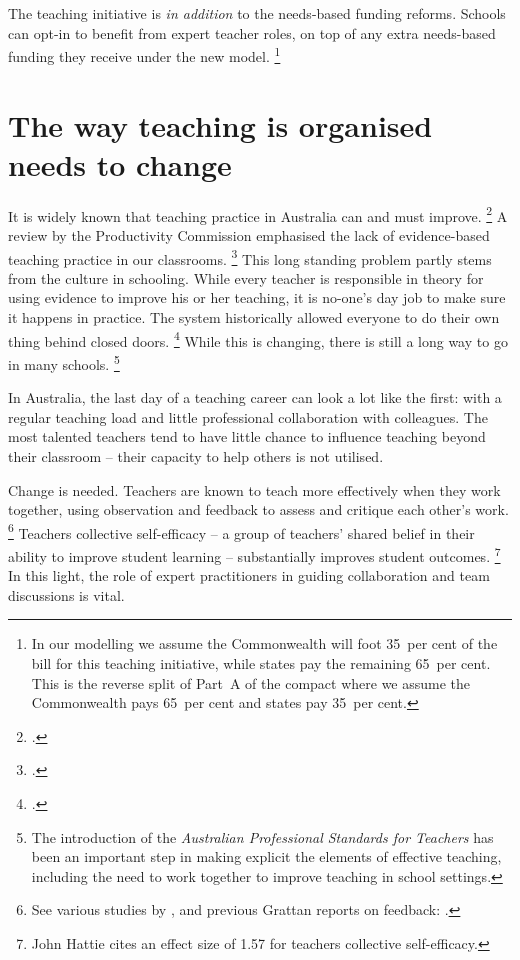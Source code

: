 \documentclass{grattan}
\begin{document}
The teaching initiative is \emph{in addition} to the needs-based funding reforms.
Schools can opt-in to benefit from expert teacher roles, on top of any extra needs-based funding they receive under the new model.%
\footnote{In our modelling we assume the Commonwealth will foot 35~per cent of the bill for this teaching initiative, while states pay the remaining 65~per cent. This is the reverse split of Part~A of the compact where we assume the Commonwealth pays 65~per cent and states pay 35~per cent.}

\section{The way teaching is organised needs to change}\label{sec:the-way-teaching-is-organised-needs-to-change}

It is widely known that teaching practice in Australia can and must improve.%
\footcites{Goss2015TargetedTeachingHow}{Jensen2010WhatTeachersWant}{Jensen2011BetterTeacherAppraisal}{Santiago2011OECDReviewsEvaluation}
A \citeyear{Commission2016NationalEducationEvidence} review by the Productivity Commission emphasised the lack of evidence-based teaching practice in our classrooms. \footcite{Commission2016NationalEducationEvidence} This long standing problem partly stems from the culture in schooling.
While every teacher is responsible in theory for using evidence to improve his or her teaching, it is no-one's day job to make sure it happens in practice.
The system historically allowed everyone to do their own thing behind closed doors.%
\footcite{Dinham2008TeachingTalentBest}
While this is changing, there is still a long way to go in many schools.%
\footnote{The introduction of the \emph{Australian Professional Standards for Teachers} has been an important step in making explicit the elements of effective teaching, including the need to work together to improve teaching in school settings.}

In Australia, the last day of a teaching career can look a lot like the first: with a regular teaching load and little professional collaboration with colleagues. The most talented teachers tend to have little chance to influence teaching beyond their classroom -- their capacity to help others is not utilised.

Change is needed. Teachers are known to teach more effectively when they work together, using observation and feedback to assess and critique each other's work.%
\footnote{See various studies by \textcites{Timperley2007TeacherProfessionalLearning}{Yoon2007ReviewingEvidenceTeacher}{Blank2009EffectsTeacherProfessional}{Desimone2009ImprovingImpactStudies}{Veen2012WhatMakesTeacher}, and previous Grattan reports on feedback: \textcites{Goss2015TargetedTeachingHow}{Jensen2011BetterTeacherAppraisal}.}
Teachers collective self-efficacy -- a group of teachers' shared belief in their ability to improve student learning -- substantially improves student outcomes.%
\footnote{\textcite{Hattie2009VisibleLearningArticle} John Hattie cites an effect size of 1.57 for teachers collective self-efficacy.}
In this light, the role of expert practitioners in guiding collaboration and team discussions is vital.
\end{document}
